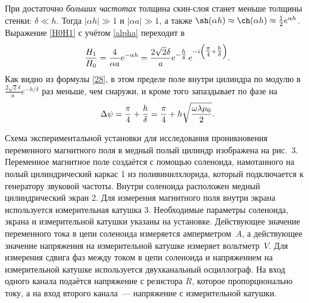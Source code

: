 При достаточно \emph{больших частотах} толщина скин-слоя станет меньше толщины стенки:
$\delta \ll h$. Тогда $|\alpha h| \gg 1$ и $|\alpha a| \gg 1$, а
также $\sh(\alpha h)\approx\ch(\alpha h)\approx\frac12e^{\alpha h}$. 
Выражение \eqref{H0H1} с учётом \eqref{alpha} переходит в
\begin{equation} \eqmark{28}
\frac{H_1}{H_0}= \frac{4}{\alpha a} e^{-\alpha h} 
= \frac{2\sqrt{2}\delta}{a}e^{-\tfrac{h}{\delta}}\,e^{-i\left(\tfrac{\pi}{4}+\tfrac{h}{\delta}\right)}.
\end{equation}
Как видно из формулы \eqref{28}, в этом пределе поле внутри цилиндра по модулю в
$\frac{2\sqrt{2}\delta}{a}e^{-h/\delta}$ раз меньше, чем снаружи, и 
кроме того запаздывает по фазе на
\begin{equation} \eqmark{29}
\Delta\psi=\frac{\pi}{4}+\frac{h}{\delta}=
\frac{\pi}{4}+h\sqrt{\frac{\omega\lambda\mu_0}{2}}.
\end{equation}





\experiment
Схема экспериментальной установки для исследования проникновения переменного магнитного поля в медный полый цилиндр
изображена на рис.~3. Переменное магнитное поле создаётся с помощью соленоида, намотанного на полый цилиндрический каркас 1
из поливинилхлорида, который подключается к генератору звуковой частоты. Внутри соленоида расположен медный цилиндрический
экран 2. Для измерения магнитного поля внутри экрана используется измерительная катушка 3. Необходимые параметры
соленоида, экрана и измерительной катушки указаны на установке. Действующее значение переменного тока в цепи соленоида
измеряется амперметром~$A$, а действующее значение напряжения 
на измерительной катушке измеряет вольтметр~$V$. Для измерения сдвига фаз между током в цепи соленоида и напряжением на измерительной катушке
используется двухканальный осциллограф. На вход одного канала подаётся напряжение с резистора $R$, которое
пропорционально току, а на вход второго канала~--- напряжение с измерительной катушки.

